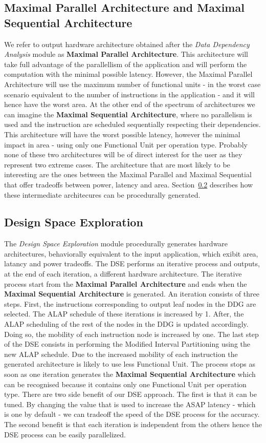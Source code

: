 \subsection{Maximal Parallel Architecture and Maximal Sequential Architecture}
We refer to output hardware architecture obtained after the \textit{Data Dependency Analysis} module as \textbf{Maximal Parallel Architecture}. This architecture will take full advantage of the parallellism of the application and will perform the computation with the minimal possible latency. However, the Maximal Parallel Architecture will use the maximum number of functional units - in the worst case scenario equivalent to the number of instructions in the application - and it will hence have the worst area.
At the other end of the spectrum of architectures we can imagine the \textbf{Maximal Sequential Architecture}, where no parallelism is used and the instruction are scheduled sequentially respecting their dependencies. This architecture will have the worst possible latency, however the minimal impact in area - using only one Functional Unit per operation type.
Probably none of these two architectures will be of direct interest for the user as they represent two extreme cases. The architecture that are most likely to be interesting are the ones between the Maximal Parallel and Maximal Sequential that offer tradeoffs between power, latency and area. Section~\ref{ssec:dse} describes how these intermediate architecures can be procedurally generated.

\subsection{Design Space Exploration}
\label{ssec:dse}
The \textit{Design Space Exploration} module procedurally generates hardware architectures, behaviorally equivalent to the input application, which exibit area, latancy and power tradeoffs. 
The DSE performs an iterative process and outputs, at the end of each iteration, a different hardware architecture. The iterative process start from the \textbf{Maximal Parallel Architecture} and ends when the \textbf{Maximal Sequential Architecture} is generated. 
An iteration consists of three steps. First, the instructions corresponding to output leaf nodes in the DDG are selected. The ALAP schedule of these iterations is increased by 1. After, the ALAP scheduling of the rest of the nodes in the DDG is updated accordingly. Doing so, the mobility of each instruction node is increased by one. The last step of the DSE consists in performing the Modified Interval Partitioning using the new ALAP schedule. Due to the increased mobility of each instruction the generated architecture is likely to use less Functional Unit.
The process stops as soon as one iteration generates the \textbf{Maximal Sequential Architecture} which can be recognised because it contains only one Functional Unit per operation type.
There are two side benefit of our DSE approach. The first is that it can be tuned. By changing the value that is used to increase the ASAP latency - which is one by default - we can tradeoff the speed of the DSE process for the accuracy. The second benefit is that each iteration is independent from the others hence the DSE process can be easily parallelized.


